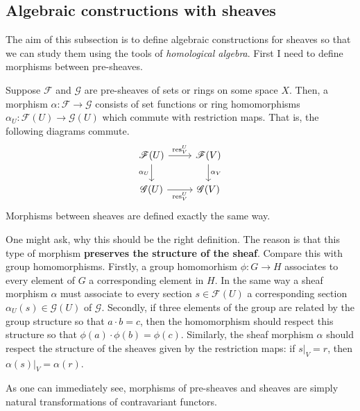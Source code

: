 \subsection{Algebraic constructions with sheaves}\label{ss:sheaf_alg}
The aim of this subsection is to define algebraic constructions for
sheaves so that we can study them using the tools of
\emph{homological algebra}. First I need to define morphisms between
pre-sheaves.
\begin{defin}
  Suppose $\mathscr{F}$ and $\mathscr{G}$ are pre-sheaves of sets or rings
  on some space $X$. Then, a morphism $\alpha:\mathscr{F}\to\mathscr{G}$
  consists of set functions or ring homomorphisms
  $\alpha_{U}:\mathscr{F}(U)\to\mathscr{G}(U)$ which commute with restriction
  maps. That is, the following diagrams commute.
  \[\begin{tikzcd}
      \mathscr{F}(U)\rar{\text{res}_{V}^{U}}\arrow[d, "\alpha_{U}"']
      & \mathscr{F}(V)\dar{\alpha_{V}} \\
      \mathscr{G}(U)\arrow[r,"\text{res}_{V}^{U}"'] & \mathscr{G}(V)
    \end{tikzcd}\]
  Morphisms between sheaves are defined exactly the same way.
\end{defin}
One might ask, why this should be the right definition. The reason is that
this type of morphism \textbf{preserves the structure of the sheaf}. Compare
this with group homomorphisms. Firstly, a group homomorhism $\phi:G\to H$
associates to every element of $G$ a corresponding element in $H$. In the
same way a sheaf morphism $\alpha$ must associate to every section
$s\in\mathscr{F}(U)$ a corresponding section $\alpha_{U}(s)\in\mathscr{G}(U)$
of $\mathscr{G}$. Secondly, if three elements of the group are related by
the group structure so that $a\cdot b = c$, then the homomorphism should
respect this structure so that $\phi(a)\cdot\phi(b)=\phi(c)$. Similarly,
the sheaf morphism $\alpha$ should respect the structure of the sheaves
given by the restriction maps: if $s\vert_{V}=r$, then $\alpha(s)\vert_{V}
=\alpha(r)$.
\begin{cat}
  As one can immediately see, morphisms of pre-sheaves and sheaves are simply
  natural transformations of contravariant functors.
\end{cat}

